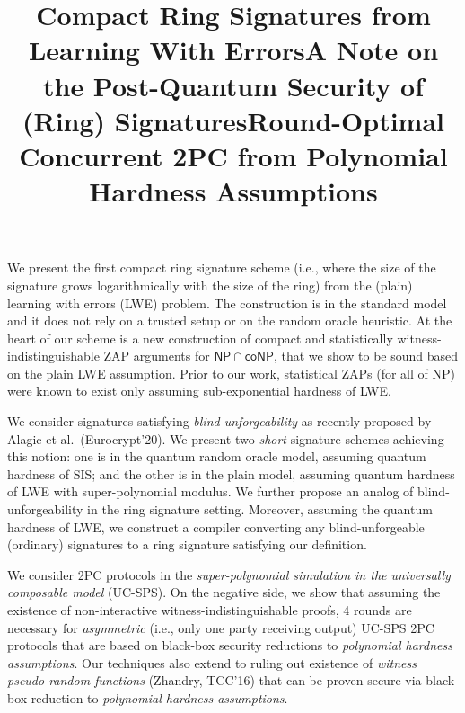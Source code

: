 \documentclass[margin]{res}
\begin{document}
\begin{resume}
\location{}
\vspace{1mm}
\title{\textbf{Compact Ring Signatures from Learning With Errors}}
\begin{position}
We present the first compact ring signature scheme (i.e., where the size of the signature grows logarithmically with the size of the ring) from the (plain) learning with errors (LWE) problem. The construction is in the standard model and it does not rely on a trusted setup or on the random oracle heuristic. At the heart of our scheme is a new construction of compact and statistically witness-indistinguishable ZAP arguments for $\mathsf{NP \cap coNP}$, that we show to be sound based on the plain LWE assumption. Prior to our work, statistical ZAPs (for all of NP) were known to exist only assuming sub-exponential hardness of LWE. 
\end{position}

\location{}
\title{\textbf{A Note on the Post-Quantum Security of (Ring) Signatures}}
\begin{position}
We consider signatures satisfying {\em blind-unforgeability} as recently proposed by Alagic et al.\ (Eurocrypt'20). We present two {\em short} signature schemes achieving this notion: one is in the quantum random oracle model, assuming quantum hardness of SIS; and the other is in the plain model, assuming quantum hardness of LWE with super-polynomial modulus. We further propose an analog of blind-unforgeability in the ring signature setting. Moreover, assuming the quantum hardness of LWE, we construct a compiler converting any blind-unforgeable (ordinary) signatures to a ring signature satisfying our definition. 
\end{position}

\location{}
\title{\textbf{Round-Optimal Concurrent 2PC from Polynomial Hardness Assumptions}}
\begin{position}
We consider 2PC protocols in the {\em super-polynomial simulation in the universally composable model} (UC-SPS). On the negative side, we show that assuming the existence of non-interactive witness-indistinguishable proofs, 4 rounds are necessary for {\em asymmetric} (i.e., only one party receiving output) UC-SPS 2PC protocols that are based on black-box security reductions to {\em polynomial hardness assumptions}. Our techniques also extend to ruling out existence of {\em witness pseudo-random functions} (Zhandry, TCC'16) that can be proven secure via black-box reduction to {\em polynomial hardness assumptions}.


\end{position}
\end{resume}
\end{document}
